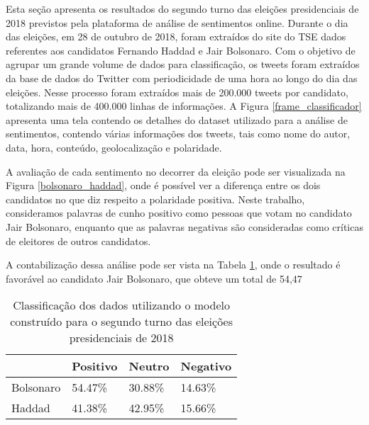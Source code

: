  
 
 
Esta seção apresenta os resultados do segundo turno das eleições presidenciais de 2018 previstos pela plataforma de 
análise de sentimentos online. Durante o dia das eleições, em 28 de outubro de 2018, foram extraídos do site do TSE dados 
referentes aos candidatos Fernando Haddad e Jair Bolsonaro. Com o objetivo de agrupar um grande volume de dados para classificação,
 os tweets foram extraídos da base de dados do Twitter com periodicidade de uma hora ao longo do dia das eleições. 
 Nesse processo foram extraídos mais de 200.000 tweets por candidato, totalizando mais de 400.000 linhas de informações. 
 A Figura \ref{frame_classificador} apresenta uma tela contendo os detalhes do dataset utilizado para a análise de sentimentos,
 contendo várias informações dos tweets, tais como nome do autor, data, hora, conteúdo, geolocalização e polaridade.
 
 
 A avaliação de cada sentimento no decorrer da eleição pode ser visualizada na Figura \ref{bolsonaro_haddad}, onde é possível ver a diferença 
 entre os dois candidatos no que diz respeito a polaridade positiva. Neste trabalho, consideramos palavras de cunho positivo como pessoas que votam 
 no candidato Jair Bolsonaro, enquanto que as palavras negativas são consideradas como críticas de eleitores de outros candidatos.

 
 A contabilização dessa análise pode ser vista na Tabela \ref{tb:bolso_haddad}, onde o resultado é favorável ao candidato Jair Bolsonaro, que obteve um total de 54,47%
 
 
 \begin{table}
     \label{tb:bolso_haddad}
     \centering
     \caption{Classificação dos dados utilizando o modelo construído para o segundo turno das eleições presidenciais de 2018}
    
     \begin{tabular}{llll}
     \hline
               & Positivo & Neutro & Negativo \\ \hline
     Bolsonaro  & 54.47\%  & 30.88\% & 14.63\%  \\ \hline
     Haddad     & 41.38\%  & 42.95\% & 15.66\%  \\ \hline
     \end{tabular}
 \end{table}
 
